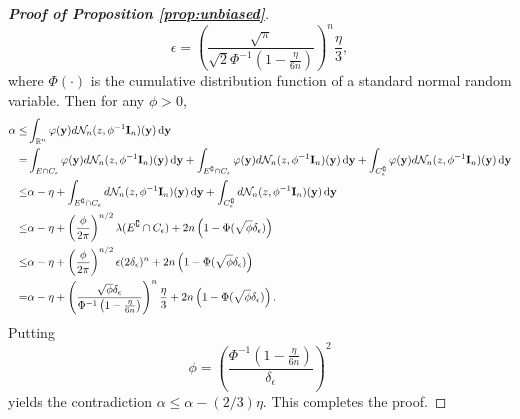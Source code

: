 \documentclass[11pt]{article}
\newcommand{\By}{\mathbf{y}}    \newcommand{\Bz}{\mathbf{z}}
\theoremstyle{plain}
\theoremstyle{definition}
\theoremstyle{remark}
\begin{document}
\begin{appendices}
\begin{proof}[\textbf{Proof of Proposition \ref{prop:unbiased}}]
    \begin{equation*}
        \epsilon=\left(\frac{\sqrt \pi}{\sqrt 2 \Phi^{-1}\left(1-\frac{\eta}{6n}\right)}\right)^n \frac{\eta}{3},
    \end{equation*}
    where $\Phi(\cdot)$ is the cumulative distribution function of a standard normal random variable.
    Then for any $\phi>0$,
    \begin{equation*}
        \begin{split}
            \alpha \leq& 
            \int_{\mathbb R^n}\varphi(\By) d\mathcal N_n (z, \phi^{-1} \BI_n) (\By)\,\mathrm{d} \By
            \\
            =&
            \int_{E\cap C_{\epsilon}}\varphi(\By) d\mathcal N_n (z, \phi^{-1} \BI_n) (\By)\,\mathrm{d} \By
            +
            \int_{E^\complement\cap C_{\epsilon}}\varphi(\By) d\mathcal N_n (z, \phi^{-1} \BI_n) (\By)\,\mathrm{d} \By
            +
            \int_{C_{\epsilon}^\complement}\varphi(\By) d\mathcal N_n (z, \phi^{-1} \BI_n) (\By)\,\mathrm{d} \By
            \\
            \leq&
            \alpha-\eta
            +
            \int_{E^\complement\cap C_{\epsilon}} d\mathcal N_n (z, \phi^{-1} \BI_n) (\By)\,\mathrm{d} \By
            +
            \int_{C_{\epsilon}^\complement} d\mathcal N_n (z, \phi^{-1} \BI_n) (\By)\,\mathrm{d} \By
            \\
            \leq&
            \alpha-\eta
            +
            \left(\frac{\phi}{2\pi}\right)^{n/2}\lambda(E^\complement\cap C_{\epsilon})
            +
            2n\left(1-\Phi(\sqrt \phi \delta_\epsilon)\right)
            \\
            \leq&
            \alpha-\eta
            +
            \left(\frac{\phi}{2\pi}\right)^{n/2}
            \epsilon
            (2\delta_\epsilon)^n
            +
            2n\left(1-\Phi(\sqrt \phi \delta_\epsilon)\right)
            \\
            =&
            \alpha-\eta
            +
            \left(\frac{\sqrt{\phi} \delta_{\epsilon}}{\Phi^{-1}\left(1-\frac{\eta}{6n}\right)}\right)^{n}
            \frac{\eta}{3}
            +
            2n\left(1-\Phi(\sqrt \phi \delta_\epsilon)\right).
        \end{split}
    \end{equation*}
    Putting 
    \begin{equation*}
        \phi = \left(\frac{\Phi^{-1}\left(1-\frac{\eta}{6n}\right)}{\delta_\epsilon}\right)^2
    \end{equation*}
    yields the contradiction $\alpha\leq \alpha-(2/3)\eta$.
    This completes the proof.


\end{proof}
\end{appendices}
\end{document}

